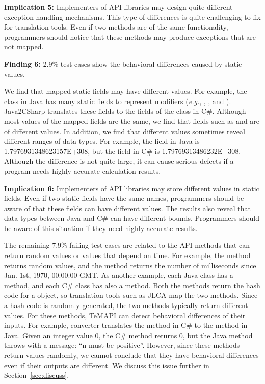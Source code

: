 \textbf{Implication 5:} Implementers of API libraries may design quite different exception handling mechanisms. This type of differences is quite challenging to fix for translation tools. Even if two methods are of the same functionality, programmers should notice that these methods may produce exceptions that are not mapped.

\textbf{Finding 6:} 2.9\% test cases show the behavioral differences caused by static values.

We find that mapped static fields may have different values. For example, the  class in Java has many static fields to represent modifiers (\emph{e.g.}, , , and ). Java2CSharp translates these fields to the fields of the  class in C\#. Although most values of the mapped fields are the same, we find that fields such as  and  are of different values. In addition, we find that different values sometimes reveal different ranges of data types. For example, the  field in Java is 1.7976931348623157E+308, but the  field in C\# is 1.79769313486232E+308.  Although the difference is not quite large, it can cause serious defects if a program needs highly accurate calculation results.

\textbf{Implication 6:} Implementers of API libraries may store different values in static fields. Even if two static fields have the same names, programmers should be aware of that these fields can have different values. The results also reveal that data types between Java and C\# can have different bounds. Programmers should be aware of this situation if they need highly accurate results.

The remaining 7.9\% failing test cases are related to the API methods that can return random values or values that depend on time. For example, the  method returns random values, and the  method returns the number of milliseconds since Jan. 1st, 1970, 00:00:00 GMT. As another example, each Java class has a  method, and each C\# class has also a  method. Both the methods return the hash code for a object, so translation tools such as JLCA map the two methods. Since a hash code is randomly generated, the two methods typically return different values. For these methods, TeMAPI can detect behavioral differences of their inputs. For example, converter translates the  method in C\# to the  method in Java. Given an integer value 0, the C\# method returns 0, but the Java method throws  with a message: ``n must be positive''. However, since these methods return values randomly, we cannot conclude that they have behavioral differences even if their outputs are different. We discuss this issue further in Section~\ref{sec:discuss}.

